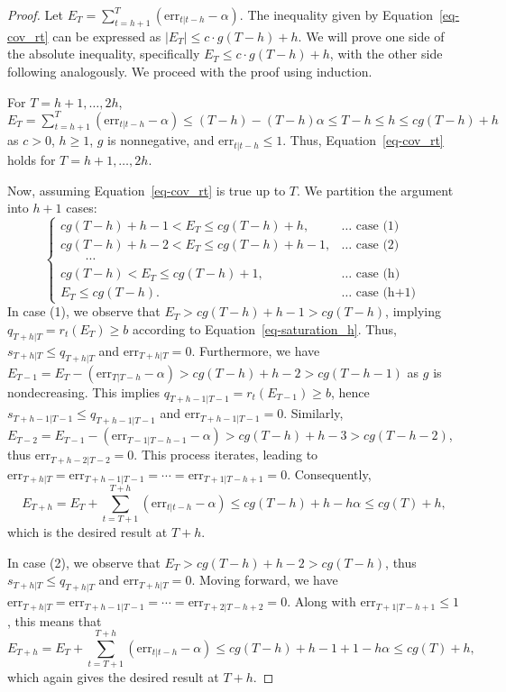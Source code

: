 \documentclass[
  11pt,
  a4paper,
]{article}
\theoremstyle{plain}
\theoremstyle{remark}
\begin{document}
\begin{proof}
Let \(E_T=\sum_{t=h+1}^{T}(\mathrm{err}_{t|t-h}-\alpha)\). The
inequality given by Equation~\ref{eq-cov_rt} can be expressed as
\(|E_T| \leq c \cdot g(T-h) + h\). We will prove one side of the
absolute inequality, specifically \(E_T \leq c \cdot g(T-h) + h\), with
the other side following analogously. We proceed with the proof using
induction.

For \(T=h+1,\ldots,2h\),
\(E_T = \sum_{t=h+1}^{T}(\mathrm{err}_{t|t-h}-\alpha) \leq (T-h)-(T-h)\alpha \leq T-h \leq h \leq cg(T-h) + h\)
as \(c>0\), \(h\geq 1\), \(g\) is nonnegative, and
\(\mathrm{err}_{t|t-h} \leq 1\). Thus, Equation~\ref{eq-cov_rt} holds
for \(T=h+1,\ldots,2h\).

Now, assuming Equation~\ref{eq-cov_rt} is true up to \(T\). We partition
the argument into \(h+1\) cases: \[
\begin{cases}
cg(T-h)+h-1 < E_T \leq cg(T-h)+h, & \ldots \text { case (1) } \\
cg(T-h)+h-2 < E_T \leq cg(T-h)+h-1, & \ldots \text { case (2) } \\
\qquad \cdots \\
cg(T-h) < E_T \leq cg(T-h)+1, & \ldots \text { case (h) } \\
E_T \leq cg(T-h). & \ldots \text { case (h+1) }
\end{cases}
\] In case (1), we observe that \(E_T > cg(T-h)+h-1 > cg(T-h)\),
implying \(q_{T+h|T} = r_t(E_{T}) \geq b\) according to
Equation~\ref{eq-saturation_h}. Thus, \(s_{T+h|T} \leq q_{T+h|T}\) and
\(\mathrm{err}_{T+h|T} = 0\). Furthermore, we have
\(E_{T-1} = E_T - (\mathrm{err}_{T|T-h} - \alpha) > cg(T-h)+h-2 > cg(T-h-1)\)
as \(g\) is nondecreasing. This implies
\(q_{T+h-1|T-1} = r_t(E_{T-1}) \geq b\), hence
\(s_{T+h-1|T-1} \leq q_{T+h-1|T-1}\) and
\(\mathrm{err}_{T+h-1|T-1} = 0\). Similarly,
\(E_{T-2} = E_{T-1} - (\mathrm{err}_{T-1|T-h-1} - \alpha) > cg(T-h)+h-3 > cg(T-h-2)\),
thus \(\mathrm{err}_{T+h-2|T-2} = 0\). This process iterates, leading to
\(\mathrm{err}_{T+h|T} = \mathrm{err}_{T+h-1|T-1} = \cdots = \mathrm{err}_{T+1|T-h+1} = 0\).
Consequently, \[
E_{T+h} = E_T+\sum_{t=T+1}^{T+h}(\mathrm{err}_{t|t-h}-\alpha) \leq cg(T-h)+h-h\alpha \leq cg(T)+h,
\] which is the desired result at \(T+h\).

In case (2), we observe that \(E_T > cg(T-h)+h-2 > cg(T-h)\), thus
\(s_{T+h|T} \leq q_{T+h|T}\) and \(\mathrm{err}_{T+h|T} = 0\). Moving
forward, we have
\(\mathrm{err}_{T+h|T} = \mathrm{err}_{T+h-1|T-1} = \cdots = \mathrm{err}_{T+2|T-h+2} = 0\).
Along with \(\mathrm{err}_{T+1|T-h+1} \leq 1\), this means that \[
E_{T+h} = E_T+\sum_{t=T+1}^{T+h}(\mathrm{err}_{t|t-h}-\alpha) \leq cg(T-h)+h-1+1-h\alpha \leq cg(T)+h,
\] which again gives the desired result at \(T+h\).


\end{proof}
\end{document}
